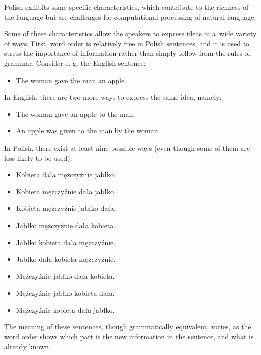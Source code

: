 \begin{multicols}{2}
Polish exhibits some specific characteristics, which contribute to the
richness of the language \cite{Pisarek2007} but are challenges for
computational processing of natural language. 


Some of these characteristics allow the speakers to express ideas in
a~wide variety of ways. First, word order is relatively free in Polish
sentences, and it is used to stress the importance of information
rather than simply follow from the rules of grammar. Consider e. g.
the English sentence: 

\begin{itemize} \item The woman gave the man an apple. \end{itemize} 

In English, there are two more ways to express the same idea, namely:
\begin{itemize} \item The woman gave an apple to the man. \item An
apple was given to the man by the woman. \end{itemize} 

In Polish, there exist at least nine possible ways (even though some
of them are less likely to be used): 

\begin{itemize} \item Kobieta dała mężczyźnie jabłko. \item
Kobieta mężczyźnie dała jabłko. \item Kobieta mężczyźnie
jabłko dała. \item Jabłko mężczyźnie dała kobieta. \item
Jabłko kobieta dała mężczyźnie. \item Jabłko dała kobieta
mężczyźnie. \item Mężczyźnie jabłko dała kobieta. \item
Mężczyźnie jabłko kobieta dała. \item Mężczyźnie kobieta dała
jabłko. \end{itemize} 

The meaning of these sentences, though grammatically equivalent,
varies, as the word order shows which part is the new information in
the sentence, and what is already known. 



\end{multicols}
